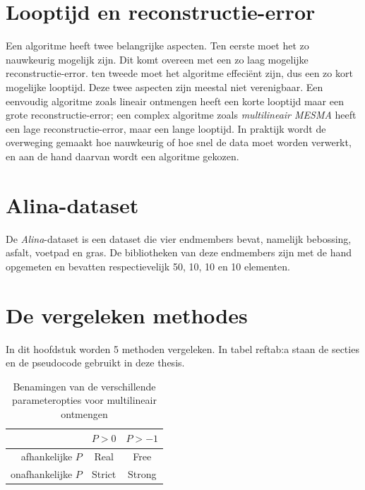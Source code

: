 \documentclass[12pt]{report}
\begin{document}
\section{Looptijd en reconstructie-error}

Een algoritme heeft twee belangrijke aspecten. Ten eerste moet het zo nauwkeurig mogelijk zijn. Dit komt overeen met een zo laag mogelijke reconstructie-error. ten tweede moet het algoritme effeci\"ent zijn, dus een zo kort mogelijke looptijd. Deze twee aspecten zijn meestal niet verenigbaar. Een eenvoudig algoritme zoals lineair ontmengen heeft een korte looptijd maar een grote reconstructie-error; een complex algoritme zoals \textit{multilineair MESMA} heeft een lage reconstructie-error, maar een lange looptijd. In praktijk wordt de overweging gemaakt hoe nauwkeurig of hoe snel de data moet worden verwerkt, en aan de hand daarvan wordt een algoritme gekozen.




\section{Alina-dataset}

De \textit{Alina}-dataset is een dataset die vier endmembers bevat, namelijk bebossing, asfalt, voetpad en gras. De bibliotheken van deze endmembers zijn met de hand opgemeten en bevatten respectievelijk 50, 10, 10 en 10 elementen. 


\section{De vergeleken methodes}

In dit hoofdstuk worden 5 methoden vergeleken. In tabel ref{tab:a} staan de secties en de pseudocode gebruikt in deze thesis.  


\begin{table}
\Large\center
\begin{tabular}{r|c c}
&$P>0$&$P>-1$ \\
\hline
afhankelijke $P$ & Real & Free \\
onafhankelijke $P$ & Strict & Strong
\end{tabular}
\caption{Benamingen van de verschillende parameteropties voor multilineair ontmengen \label{tab:b}}
\end{table}
\end{document}
